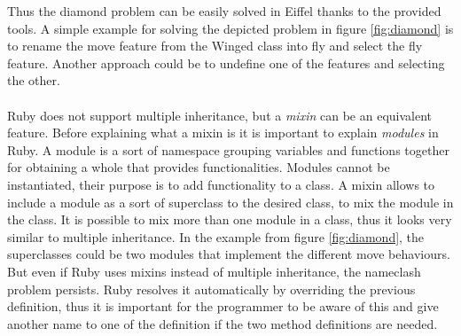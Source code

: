 \documentclass[12pt,a4paper,twocolumn]{article}
\begin{document}
Thus the diamond problem can be easily solved in Eiffel thanks to the provided tools. A simple example for solving the depicted problem in figure \ref{fig:diamond} is to rename the move feature from the Winged class into fly and select the fly feature. Another approach could be to undefine one of the features and selecting the other.
\\
\\
Ruby does not support multiple inheritance,  but a \emph{mixin} \cite{wiki:class, thomas2001programming} can be an equivalent feature. Before explaining what a mixin is it is important to explain \emph{modules} in Ruby. A module is a sort of namespace grouping variables and functions together for obtaining a whole that provides functionalities. Modules cannot be instantiated, their purpose is to add functionality to a class. A mixin allows to include a module as a sort of superclass to the desired class, to mix the module in the class. It is possible to mix more than one module in a class, thus it looks very similar to multiple inheritance. In the example from figure \ref{fig:diamond}, the superclasses could be two modules that implement the different move behaviours. But even if Ruby uses mixins instead of multiple inheritance, the nameclash problem persists. Ruby resolves it automatically by overriding the previous definition, thus it is important for the programmer to be aware of this and give another name to one of the definition if the two method definitions are needed.
\end{document}
